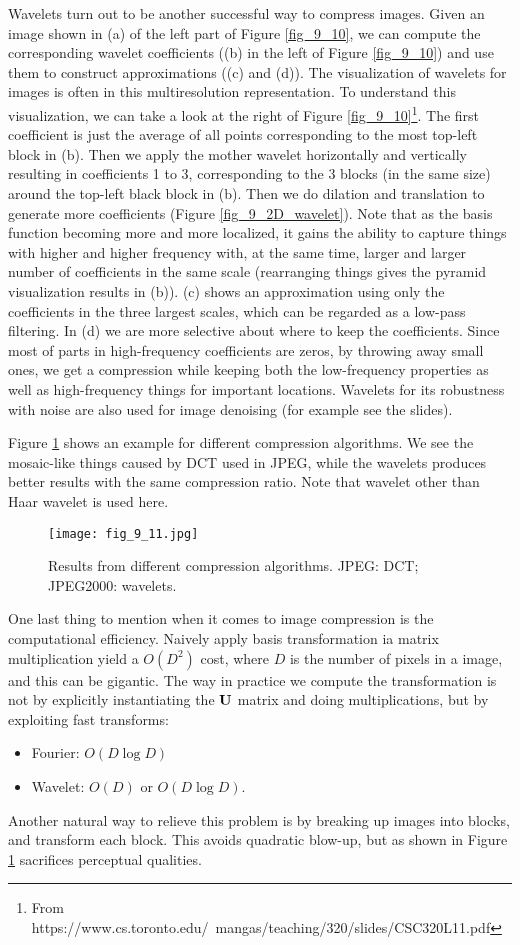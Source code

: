 \documentclass[../main.tex]{subfiles}
\begin{document}
\par Wavelets turn out to be another successful way to compress images. Given an image shown in (a) of the left part of Figure \ref{fig_9_10}, we can compute the corresponding wavelet coefficients ((b) in the left of Figure \ref{fig_9_10}) and use them to construct approximations ((c) and (d)). The visualization of wavelets for images is often in this multiresolution representation. To understand this visualization, we can take a look at the right of Figure \ref{fig_9_10}\footnote{From https://www.cs.toronto.edu/~mangas/teaching/320/slides/CSC320L11.pdf
}. The first coefficient is just the average of all points corresponding to the most top-left block in (b). Then we apply the mother wavelet horizontally and vertically resulting in coefficients 1 to 3, corresponding to the 3 blocks (in the same size) around the top-left black block in (b). Then we do dilation and translation to generate more coefficients (Figure \ref{fig_9_2D_wavelet}). Note that as the basis function becoming more and more localized, it gains the ability to capture things with higher and higher frequency with, at the same time, larger and larger number of coefficients in the same scale (rearranging things gives the pyramid visualization results in (b)). (c) shows an approximation using only the coefficients in the three largest scales, which can be regarded as a low-pass filtering. In (d) we are more selective about where to keep the coefficients. Since most of parts in high-frequency coefficients are zeros, by throwing away small ones, we get a compression while keeping both the low-frequency properties as well as high-frequency things for important locations. Wavelets for its robustness with noise are also used for image denoising (for example see the slides).
\par Figure \ref{fig_9_11} shows an example for different compression algorithms. We see the mosaic-like things caused by DCT used in JPEG, while the wavelets produces better results with the same compression ratio. Note that wavelet other than Haar wavelet is used here.
\begin{figure}[h] 
	\centering 
	\texttt{[image: fig\_9\_11.jpg]} 
	\caption{Results from different compression algorithms. JPEG: DCT; JPEG2000: wavelets.}\label{fig_9_11}
\end{figure}
One last thing to mention when it comes to image compression is the computational efficiency. Naively apply basis transformation ia matrix multiplication yield a $O(D^2)$ cost, where $D$ is the number of pixels in a image, and this can be gigantic. The way in practice we compute the transformation is not by explicitly instantiating the ${\bf U}$ matrix and doing multiplications, but by exploiting fast transforms:
\begin{itemize}
	\item Fourier: $O(D\log D)$
	\item Wavelet: $O(D)$ or $O(D\log D)$.
\end{itemize}
Another natural way to relieve this problem is by breaking up images into blocks, and transform each block. This avoids quadratic blow-up, but as shown in Figure \ref{fig_9_11} sacrifices perceptual qualities.
\end{document}
